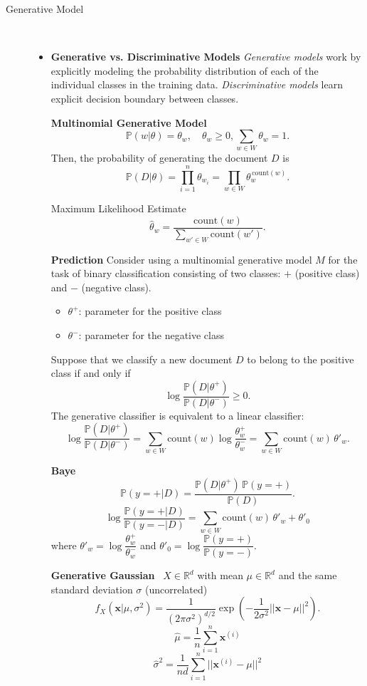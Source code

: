 \documentclass[a4paper, 10pt,landscape]{article}
\begin{document}
\begin{multicols*}{3}
\begin{description}
	\item[Generative Model]~
		\begin{itemize}
			\item {\bf Generative vs. Discriminative Models} {\it Generative models} work by explicitly modeling the probability distribution of each of the individual classes in the training data. {\it Discriminative models} learn explicit decision boundary between classes.
			\item[] {\bf Multinomial Generative Model}~
				$$\mathbb{P}\left(w|\theta\right)=\theta_w,\quad\theta_w\geq0,\sum_{w\in W}\theta_w=1.$$
					Then, the probability of generating the document $D$ is
					$$\mathbb{P}\left(D|\theta\right)=\prod_{i=1}^{n}\theta_{w_i}=\prod_{w\in W}\theta_w^{\,\text{count}(w)}.$$
					\item[Maximum Likelihood Estimate] 
					$$\widehat{\theta}_w=\dfrac{\text{count}(w)}{\sum\limits_{w'\in W}\text{count}(w')}.$$
					\item[] {\bf Prediction} Consider using a multinomial generative model $M$ for the task of binary classification consisting of two classes: $+$ (positive class) and $-$ (negative class).
					\begin{itemize}
						\item $\theta^+$: parameter for the positive class
						\item $\theta^-$: parameter for the negative class
					\end{itemize}
					Suppose that we classify a new document $D$ to belong to the positive class if and only if
					$$\log\dfrac{\mathbb{P}(D|\theta^+)}{\mathbb{P}(D|\theta^-)}\geq0.$$
					The generative classifier is equivalent to a linear classifier:
					$$\log\dfrac{\mathbb{P}(D|\theta^+)}{\mathbb{P}(D|\theta^-)}=\sum_{w\in W}\text{count}(w)\log\dfrac{\theta_w^+}{\theta_w^-}=\sum_{w\in W}\text{count}(w)\,\theta'_w.$$
					\item[] {\bf Baye} ~
					$$\mathbb{P}\left(y=+|D\right)=\dfrac{\mathbb{P}(D|\theta^+)\,\mathbb{P}(y=+)}{\mathbb{P}(D)}.$$
					$$\log\dfrac{\mathbb{P}\left(y=+|D\right)}{\mathbb{P}\left(y=-|D\right)}=\sum_{w\in W}\text{count}(w)\,\theta'_w+\theta'_0$$
	where $\theta'_w=\log\dfrac{\theta^+_w}{\theta^-_w}$ and $\theta'_0=\log\dfrac{\mathbb{P}(y=+)}{\mathbb{P}(y=-)}$.
	
					\item[] {\bf Generative Gaussian}~
						$X \in \mathbb{R}^d$ with mean $\mu \in \mathbb{R}^d$ and the same standard deviation $\sigma$ (uncorrelated)
						$$f_X\left(\mathbf{x}|\mu,\sigma^2\right)=\dfrac{1}{\left(2\pi\sigma^2\right)^{d/2}}\exp(-\dfrac{1}{2\sigma^2}||\mathbf{x}-\mu||^2).$$
					      $$\widehat{\mu}=\frac{1}{n}\sum_{i=1}^{n}\mathbf{x}^{(i)}$$
						$$\widehat{\sigma}^2=\frac{1}{nd}\sum_{i=1}^{n} ||\mathbf{x}^{(i)}-\mu||^2$$
					\end{itemize}
\end{description}


\end{multicols*}
\end{document}
